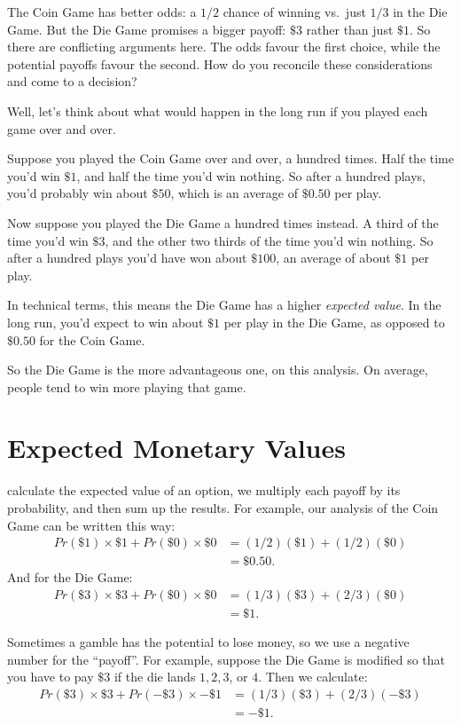 \documentclass[justified]{tufte-book}
\newcommand{\p}{Pr}
\theoremstyle{definition}
\theoremstyle{definition}
\theoremstyle{definition}
\theoremstyle{remark}
\begin{document}
The Coin Game has better odds: a \(1/2\) chance of winning vs.~just
\(1/3\) in the Die Game. But the Die Game promises a bigger payoff:
\(\$3\) rather than just \(\$1\). So there are conflicting arguments
here. The odds favour the first choice, while the potential payoffs
favour the second. How do you reconcile these considerations and come to
a decision?

Well, let's think about what would happen in the long run if you played
each game over and over.

Suppose you played the Coin Game over and over, a hundred times. Half
the time you'd win \(\$1\), and half the time you'd win nothing. So
after a hundred plays, you'd probably win about \(\$50\), which is an
average of \(\$0.50\) per play.

Now suppose you played the Die Game a hundred times instead. A third of
the time you'd win \(\$3\), and the other two thirds of the time you'd
win nothing. So after a hundred plays you'd have won about \(\$100\), an
average of about \(\$1\) per play.

In technical terms, this means the Die Game has a higher \emph{expected
value}. In the long run, you'd expect to win about \(\$1\) per play in
the Die Game, as opposed to \(\$0.50\) for the Coin Game.

So the Die Game is the more advantageous one, on this analysis. On
average, people tend to win more playing that game.

\hypertarget{expected-monetary-values}{%
\section{Expected Monetary Values}\label{expected-monetary-values}}

 calculate the expected value of an option, we multiply
each payoff by its probability, and then sum up the results. For
example, our analysis of the Coin Game can be written this way: \[
  \begin{aligned}
    \p(\$1) \times \$1 + \p(\$0) \times \$0 &= (1/2)(\$1) + (1/2)(\$0)\\
      &= \$0.50.
  \end{aligned}
\] And for the Die Game: \[
  \begin{aligned}
    \p(\$3) \times \$3 + \p(\$0) \times \$0 &= (1/3)(\$3) + (2/3)(\$0)\\
      &= \$1.
  \end{aligned}
\]

Sometimes a gamble has the potential to lose money, so we use a negative
number for the ``payoff''. For example, suppose the Die Game is modified
so that you have to pay \(\$3\) if the die lands \(1, 2, 3\), or \(4\).
Then we calculate: \[
  \begin{aligned}
    \p(\$3) \times \$3 + \p(-\$3) \times -\$1 &= (1/3)(\$3) + (2/3)(-\$3)\\
      &= -\$1.
  \end{aligned}
\]
\end{document}
